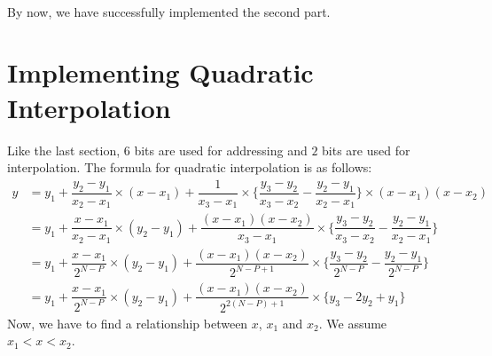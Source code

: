 \documentclass{article}
\let\oldsection\section
\renewcommand{\section}{%
    \setcounter{subsection}{0}%
    \oldsection%
}
\begin{document}
~\\By now, we have successfully implemented the second part.

\section{Implementing Quadratic Interpolation}
Like the last section, $6$ bits are used for addressing and $2$ bits are used for interpolation. The formula for quadratic interpolation is as follows:
\begin{align}
    y &= y_1 + \dfrac{y_2 - y_1}{x_2 - x_1} \times (x - x_1) + \dfrac{1}{x_3 - x_1} \times \{ \dfrac{y_3 - y_2}{x_3 - x_2} - \dfrac{y_2 - y_1}{x_2 - x_1}\} \times (x-x_1) (x-x_2) \\
    &= y_1 + \dfrac{x - x_1}{x_2 - x_1} \times (y_2 - y_1) + \dfrac{(x-x_1) (x-x_2)}{x_3 - x_1} \times \{ \dfrac{y_3 - y_2}{x_3 - x_2} - \dfrac{y_2 - y_1}{x_2 - x_1}\} \\
    &= y_1 + \dfrac{x-x_1}{2^{N-P}} \times (y_2 - y_1) + \dfrac{(x-x_1) (x-x_2)}{2^{N-P+1}} \times \{ \dfrac{y_3 - y_2}{2^{N-P}} - \dfrac{y_2 - y_1}{2^{N-P}}\} \\
    &= y_1 + \dfrac{x-x_1}{2^{N-P}} \times (y_2 - y_1) + \dfrac{(x-x_1) (x-x_2)}{2^{2(N-P)+1}} \times \{ y_3 - 2y_2 + y_1\}
\end{align}
Now, we have to find a relationship between $x$, $x_1$ and $x_2$. We assume $x_1 < x < x_2$.
\end{document}
